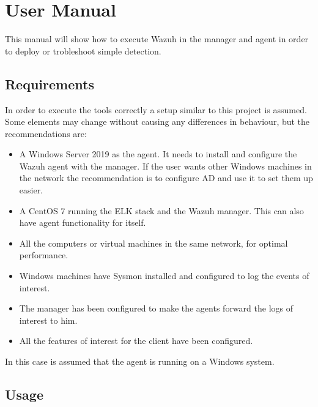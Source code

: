\chapter{User Manual}
This manual will show how to execute Wazuh in the manager and agent in order to deploy or trobleshoot simple detection.

\section*{Requirements}
In order to execute the tools correctly a setup similar to this project is assumed.
Some elements may change without causing any differences in behaviour, but the recommendations are:
\begin{itemize}
	\item A Windows Server 2019 as the agent. It needs to install and configure the Wazuh agent with the manager. If the user wants other Windows machines in the network the recommendation is to configure AD and use it to set them up easier.
	\item A CentOS 7 running the ELK stack and the Wazuh manager. This can also have agent functionality for itself.
	\item All the computers or virtual machines in the same network, for optimal performance.
	\item Windows machines have Sysmon installed and configured to log the events of interest.
	\item The manager has been configured to make the agents forward the logs of interest to him.
	\item All the features of interest for the client have been configured.
\end{itemize}
\linej
In this case is assumed that the agent is running on a Windows system.

\section*{Usage}
